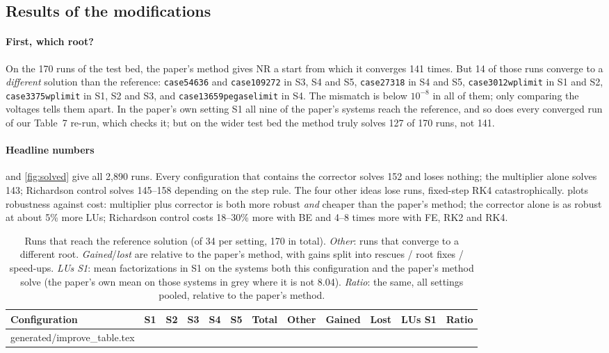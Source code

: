 \documentclass[sigconf,nonacm]{acmart}
\makeatletter
\newcommand{\rows}[1]{\@@input #1 }
\newcommand{\thead}[1]{\textbf{#1}}
\newcommand{\code}[1]{\texttt{#1}}
\makeatother
\begin{document}
\subsection{Results of the modifications}\label{sec:modresults}

\paragraph{First, which root?}\label{sec:rootcheck}
On the 170 runs of the test bed, the paper's method gives NR a start from which it converges 141 times. But
14 of those runs converge to a \emph{different} solution than the reference: \code{case54636} and
\code{case109272} in S3, S4 and S5, \code{case27318} in S4 and S5, \code{case3012wplimit} in S1 and S2,
\code{case3375wplimit} in S1, S2 and S3, and \code{case13659pegaselimit} in S4. The mismatch is below
$10^{-8}$ in all of them; only comparing the voltages tells them apart. In the paper's own setting S1 all
nine of the paper's systems reach the reference, and so does every converged run of our Table~7 re-run,
which checks it; but on the wider test bed the method truly solves 127 of 170 runs, not 141.

\paragraph{Headline numbers}  and \cref{fig:solved} give all 2{,}890 runs. Every
configuration that contains the corrector solves 152 and loses nothing; the multiplier alone solves 143;
Richardson control solves 145--158 depending on the step rule. The four other ideas lose runs, fixed-step
RK4 catastrophically.  plots robustness against cost: multiplier plus corrector is both
more robust \emph{and} cheaper than the paper's method; the corrector alone is as robust at about 5\% more
LUs; Richardson control costs 18--30\% more with BE and 4--8 times more with FE, RK2 and RK4.

\begin{table}[t]
\centering
\caption{Runs that reach the reference solution (of 34 per setting, 170 in total). \emph{Other}: runs that
converge to a different root. \emph{Gained}/\emph{lost} are relative to the paper's method, with gains split
into rescues / root fixes / speed-ups. \emph{LUs S1}: mean factorizations in S1 on the systems both this
configuration and the paper's method solve (the paper's own mean on those systems in grey where it is not
8.04). \emph{Ratio}: the same, all settings pooled, relative to the paper's method.}
\label{tab:improve}
\footnotesize
\setlength{\tabcolsep}{4.5pt}
\begin{tabular}{@{}l r r r r r r r l r l r@{}}
\toprule
\thead{Configuration} & \thead{S1} & \thead{S2} & \thead{S3} & \thead{S4} & \thead{S5} & \thead{Total} & \thead{Other} & \thead{Gained} & \thead{Lost} & \thead{LUs S1} & \thead{Ratio} \\
\midrule
\rows{generated/improve_table.tex}
\bottomrule
\end{tabular}
\end{table}
\end{document}
